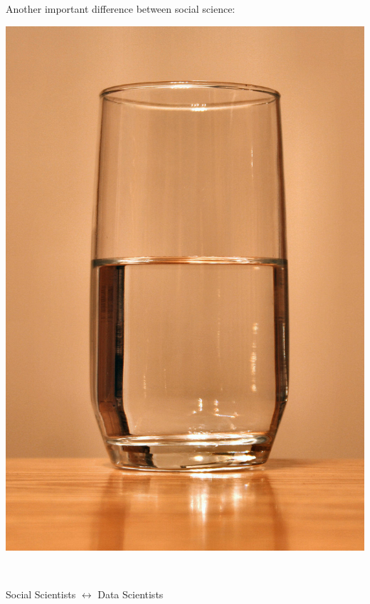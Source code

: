 \documentclass{beamer}
\def\vf{\vfill}
\begin{document}
\begin{frame}

Another important difference between social science:
\begin{center}
\includegraphics[height=0.8\textheight]{figures/glass-of-water.jpg}
\end{center}

\vf
\vspace{0.5in}
\\
\end{frame}
\begin{frame}

\begin{center}
\LARGE{Social Scientists $\longleftrightarrow$ Data Scientists}
\end{center}

\end{frame}
\end{document}
